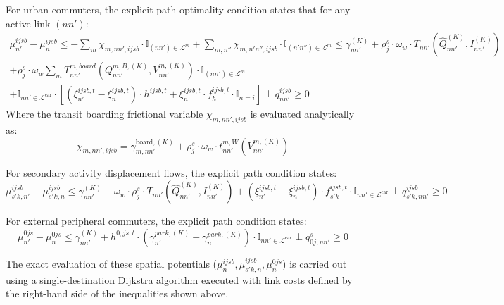 \documentclass[11pt,a4paper]{article}
\begin{document}
For urban commuters, the explicit path optimality condition states that for any active link $(nn')$:
\begin{align}
    \mu^{ijsb}_{n'} - \mu^{ijsb}_{n} \le - \sum_{m} \chi_{m,nn',ijsb} \cdot \mathbb{I}_{(nn') \in \mathcal{L}^m} +\sum_{m, n''} \chi_{m,n'n'',ijsb} \cdot \mathbb{I}_{(n'n'') \in \mathcal{L}^m} \le \gamma_{nn'}^{(K)} + \rho^s_j \cdot \omega_w \cdot T_{nn'}(\hat Q_{nn'}^{(K)}, I_{nn'}^{(K)}) \nonumber \\
    + \rho^s_j \cdot \omega_w \sum_m T^{m,board}_{nn'}(Q_{nn'}^{m,B,(K)}, V_{nn'}^{m,(K)}) \cdot \mathbb{I}_{(nn') \in \mathcal{L}^m} \nonumber \\
    + \mathbb{I}_{nn' \in \mathcal{L}^{\mathrm{car}}} \cdot \left [(\xi_{n'}^{ijsb,t} - \xi_{n}^{ijsb,t})\cdot h^{ijsb,t} + \xi_n^{ijsb,t} \cdot f^{ijsb,t}_h \cdot \mathbb{I}_{n=i} \right] \perp q^{ijsb}_{nn'} \ge 0 \label{eq:foc_commuter}
\end{align}
Where the transit boarding frictional variable $\chi_{m,nn',ijsb}$ is evaluated analytically as:
\begin{equation}
    \chi_{m,nn',ijsb} = \gamma^{\text{board},(K)}_{m,nn'} + \rho^s_j \cdot \omega_w \cdot t^{m,W}_{nn'}(V^{m,(K)}_{nn'})
\end{equation}

For secondary activity displacement flows, the explicit path condition states:
\begin{equation}
    \mu^{ijsb}_{s'k,n'} - \mu^{ijsb}_{s'k,n} \le \gamma_{nn'}^{(K)} + \omega_w \cdot \rho^s_j \cdot T_{nn'}(\hat Q_{nn'}^{(K)}, I_{nn'}^{(K)}) + \left( \xi^{ijsb,t}_{n'} - \xi^{ijsb,t}_{n} \right) \cdot f^{ijsb,t}_{s'k} \cdot \mathbb{I}_{nn' \in \mathcal{L}^{\mathrm{car}}} \perp q^{ijsb}_{s'k,nn'} \ge 0
\end{equation}

For external peripheral commuters, the explicit path condition states:
\begin{equation}
    \mu^{0js}_{n'} - \mu^{0js}_n \le \gamma_{nn'}^{(K)} + h^{0,js,t}\cdot (\gamma^{park,(K)}_{n'} - \gamma^{park,(K)}_n) \cdot \mathbb{I}_{nn' \in \mathcal{L}^{\mathrm{car}}} \perp q^s_{0j,nn'} \ge 0
\end{equation}

The exact evaluation of these spatial potentials ($\mu^{ijsb}_n, \mu^{ijsb}_{s'k,n}, \mu^{0js}_n$) is carried out using a single-destination Dijkstra algorithm executed with link costs defined by the right-hand side of the inequalities shown above.
\end{document}
